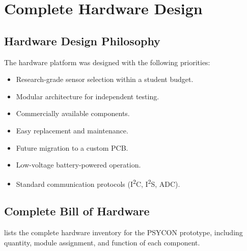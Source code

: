 \section{Complete Hardware Design}
\label{sec:hardware-design}

\subsection{Hardware Design Philosophy}
\label{sec:hardware-design-philosophy}

The hardware platform was designed with the following priorities:
\begin{itemize}
    \item Research-grade sensor selection within a student budget.
    \item Modular architecture for independent testing.
    \item Commercially available components.
    \item Easy replacement and maintenance.
    \item Future migration to a custom PCB.
    \item Low-voltage battery-powered operation.
    \item Standard communication protocols (I\textsuperscript{2}C, I\textsuperscript{2}S, ADC).
\end{itemize}

\subsection{Complete Bill of Hardware}
\label{sec:bill-of-hardware}

 lists the complete hardware inventory for the PSYCON prototype, including quantity, module assignment, and function of each component.

